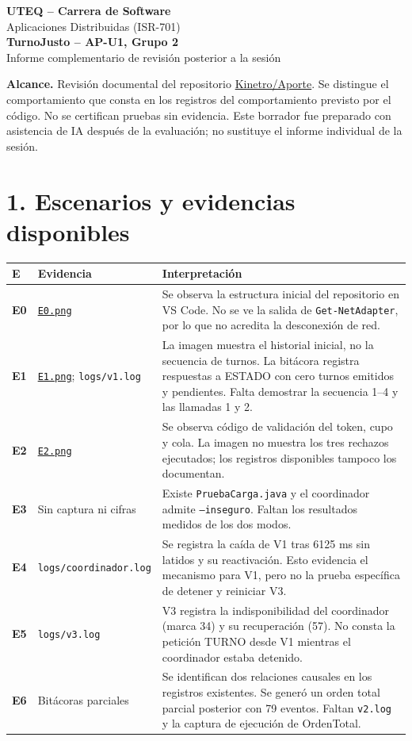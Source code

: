 \documentclass[11pt,a4paper]{article}
\newcommand{\evidencia}[1]{\href{https://github.com/Kinetro/Aporte/blob/main/docs/img/#1.png}{\texttt{#1.png}}}
\begin{document}
\begin{center}
{\large\bfseries UTEQ -- Carrera de Software}\\
Aplicaciones Distribuidas (ISR-701)\\[4pt]
{\Large\bfseries TurnoJusto -- AP-U1, Grupo 2}\\
Informe complementario de revisión posterior a la sesión
\end{center}
\smallskip
\textbf{Alcance.} Revisión documental del repositorio \href{https://github.com/Kinetro/Aporte}{Kinetro/Aporte}. Se distingue el comportamiento que consta en los registros del comportamiento previsto por el código. No se certifican pruebas sin evidencia. Este borrador fue preparado con asistencia de IA después de la evaluación; no sustituye el informe individual de la sesión.

\section*{1. Escenarios y evidencias disponibles}
\small
\begin{tabular}{|>{\bfseries}p{0.65cm}|p{3.15cm}|p{10.95cm}|}
\hline
E & Evidencia & Interpretación \\ \hline
E0 & \evidencia{E0} & Se observa la estructura inicial del repositorio en VS Code. No se ve la salida de \texttt{Get-NetAdapter}, por lo que no acredita la desconexión de red. \\ \hline
E1 & \evidencia{E1}; \texttt{logs/v1.log} & La imagen muestra el historial inicial, no la secuencia de turnos. La bitácora registra respuestas a ESTADO con cero turnos emitidos y pendientes. Falta demostrar la secuencia 1--4 y las llamadas 1 y 2. \\ \hline
E2 & \evidencia{E2} & Se observa código de validación del token, cupo y cola. La imagen no muestra los tres rechazos ejecutados; los registros disponibles tampoco los documentan. \\ \hline
E3 & Sin captura ni cifras & Existe \texttt{PruebaCarga.java} y el coordinador admite \texttt{--inseguro}. Faltan los resultados medidos de los dos modos. \\ \hline
E4 & \texttt{logs/}\newline\texttt{coordinador.log} & Se registra la caída de V1 tras 6125 ms sin latidos y su reactivación. Esto evidencia el mecanismo para V1, pero no la prueba específica de detener y reiniciar V3. \\ \hline
E5 & \texttt{logs/v3.log} & V3 registra la indisponibilidad del coordinador (marca 34) y su recuperación (57). No consta la petición TURNO desde V1 mientras el coordinador estaba detenido. \\ \hline
E6 & Bitácoras parciales & Se identifican dos relaciones causales en los registros existentes. Se generó un orden total parcial posterior con 79 eventos. Faltan \texttt{v2.log} y la captura de ejecución de OrdenTotal. \\ \hline
\end{tabular}
\normalsize
\end{document}
